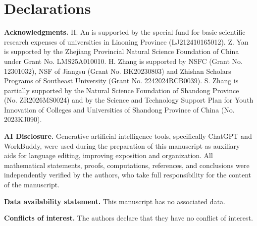 \documentclass[12pt]{amsart}
\theoremstyle{plain}
\theoremstyle{definition}
\theoremstyle{remark}
\begin{document}
\section*{Declarations}\label{sec:declarations}

\noindent\textbf{Acknowledgments.} H. An is supported by the special fund for basic scientific
research expenses of universities in Liaoning Province (LJ212410165012). Z. Yan is supported by the
Zhejiang Provincial Natural Science Foundation of China under Grant No. LMS25A010010. H. Zhang is
supported by NSFC (Grant No. 12301032), NSF of Jiangsu (Grant No. BK20230803) and Zhishan Scholars
Programs of Southeast University (Grant No. 2242024RCB0039). S. Zhang is partially supported by the
Natural Science Foundation of Shandong Province (No. ZR2026MS0024) and by the Science and
Technology Support Plan for Youth Innovation of Colleges and Universities of Shandong Province of
China (No. 2023KJ090).



\noindent\textbf{AI Disclosure.} Generative artificial intelligence tools, specifically ChatGPT and
WorkBuddy, were used during the preparation of this manuscript as auxiliary aids for language
editing, improving exposition and organization. All mathematical statements, proofs,
computations, references, and conclusions were independently verified by the authors, who take full
responsibility for the content of the manuscript.


\noindent\textbf{Data availability statement.} This manuscript has no associated data.



\noindent\textbf{Conflicts of interest.} The authors declare that they have no conflict of
interest.
\end{document}
